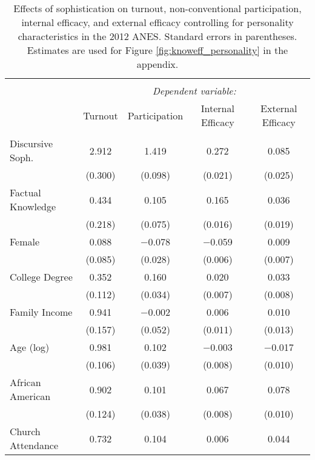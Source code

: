 
\begin{table}[!htbp] \centering 
  \caption[Effects of sophistication on turnout, non-conventional participation, internal efficacy, 
  and external efficacy controlling for personality characteristics in the 2012 ANES]{Effects of sophistication on turnout, non-conventional participation, internal efficacy, 
          and external efficacy controlling for personality characteristics in the 2012 ANES. 
          Standard errors in parentheses. Estimates are used for Figure \ref{fig:knoweff_personality} 
          in the appendix.} 
  \label{tab:knoweff2012_personality} 
\begin{tabular}{@{\extracolsep{0pt}}lcccc} 
\\[-1.8ex]\hline 
\hline \\[-1.8ex] 
 & \multicolumn{4}{c}{\textit{Dependent variable:}} \\ 
\cline{2-5} 
 & Turnout & Participation & Internal Efficacy & External Efficacy \\ 
\hline \\[-1.8ex] 
 Discursive Soph. & 2.912 & 1.419 & 0.272 & 0.085 \\ 
  & (0.300) & (0.098) & (0.021) & (0.025) \\ 
  Factual Knowledge & 0.434 & 0.105 & 0.165 & 0.036 \\ 
  & (0.218) & (0.075) & (0.016) & (0.019) \\ 
  Female & 0.088 & $-$0.078 & $-$0.059 & 0.009 \\ 
  & (0.085) & (0.028) & (0.006) & (0.007) \\ 
  College Degree & 0.352 & 0.160 & 0.020 & 0.033 \\ 
  & (0.112) & (0.034) & (0.007) & (0.008) \\ 
  Family Income & 0.941 & $-$0.002 & 0.006 & 0.010 \\ 
  & (0.157) & (0.052) & (0.011) & (0.013) \\ 
  Age (log) & 0.981 & 0.102 & $-$0.003 & $-$0.017 \\ 
  & (0.106) & (0.039) & (0.008) & (0.010) \\ 
  African American & 0.902 & 0.101 & 0.067 & 0.078 \\ 
  & (0.124) & (0.038) & (0.008) & (0.010) \\ 
  Church Attendance & 0.732 & 0.104 & 0.006 & 0.044 \\ 

\end{tabular}
\end{table}
